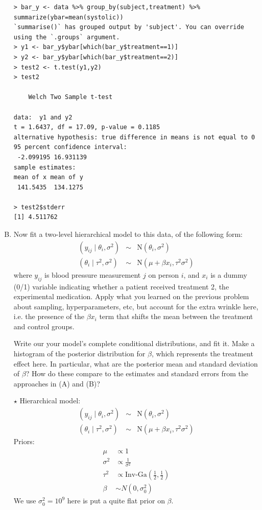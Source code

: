 \documentclass[11pt]{article}
\newcommand{\jie}{$\star$ }
\newcommand{\half}{\frac{1}{2}}
\begin{document}
\begin{enumerate}[(A)]
\begin{lstlisting}
> bar_y <- data %>% group_by(subject,treatment) %>% summarize(ybar=mean(systolic))
`summarise()` has grouped output by 'subject'. You can override using the `.groups` argument.
> y1 <- bar_y$ybar[which(bar_y$treatment==1)]
> y2 <- bar_y$ybar[which(bar_y$treatment==2)]
> test2 <- t.test(y1,y2)
> test2

	Welch Two Sample t-test

data:  y1 and y2
t = 1.6437, df = 17.09, p-value = 0.1185
alternative hypothesis: true difference in means is not equal to 0
95 percent confidence interval:
 -2.099195 16.931139
sample estimates:
mean of x mean of y 
 141.5435  134.1275 

> test2$stderr
[1] 4.511762
\end{lstlisting}
\bigskip

\item Now fit a two-level hierarchical model to this data, of the following form:
\begin{eqnarray*}
(y_{ij} \mid \theta_i, \sigma^2) &\sim& \mbox{N}(\theta_i, \sigma^2) \\
(\theta_i \mid \tau^2, \sigma^2) &\sim& \mbox{N}(\mu + \beta x_i, \tau^2 \sigma^2)
\end{eqnarray*}
where $y_{ij}$ is blood pressure measurement $j$ on person $i$, and $x_i$ is a dummy (0/1) variable indicating whether a patient received treatment 2, the experimental medication.   Apply what you learned on the previous problem about sampling, hyperparameters, etc, but account for the extra wrinkle here, i.e. the presence of the $\beta x_i$ term that shifts the mean between the treatment and control groups.  

Write our your model's complete conditional distributions, and fit it.  Make a histogram of the posterior distribution for $\beta$, which represents the treatment effect here.  In particular, what are the posterior mean and standard deviation of $\beta$?  How do these compare to the estimates and standard errors from the approaches in (A) and (B)?  

\bigskip
\jie
Hierarchical model:
\begin{eqnarray*}
(y_{ij} \mid \theta_i, \sigma^2) &\sim& \mbox{N}(\theta_i, \sigma^2) \\
(\theta_i \mid \tau^2, \sigma^2) &\sim& \mbox{N}(\mu + \beta x_i, \tau^2 \sigma^2)
\end{eqnarray*}
Priors:
\begin{align*}
    \mu &\propto 1 \\
    \sigma^2 &\propto \frac{1}{\sigma^2} \\
    \tau^2 &\propto \text{Inv-Ga}(\half,\half) \\
    \beta &\sim N(0,\sigma_0^2)
\end{align*}
We use $\sigma_0^2 = 10^9$ here is put a quite flat prior on $\beta$.


\end{enumerate}
\end{document}
